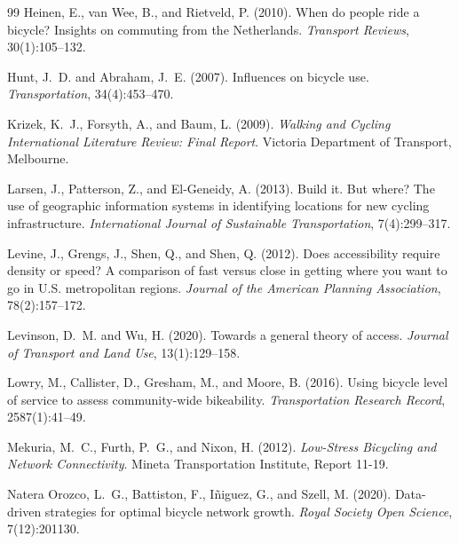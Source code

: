 \documentclass[12pt,a4paper]{article}
\begin{document}
\begin{thebibliography}{99}
Heinen, E., van Wee, B., and Rietveld, P. (2010).
\newblock When do people ride a bicycle? {I}nsights on commuting from the {N}etherlands.
\newblock \textit{Transport Reviews}, 30(1):105--132.

Hunt, J.~D. and Abraham, J.~E. (2007).
\newblock Influences on bicycle use.
\newblock \textit{Transportation}, 34(4):453--470.

Krizek, K.~J., Forsyth, A., and Baum, L. (2009).
\newblock \textit{Walking and Cycling International Literature Review: Final Report}.
\newblock Victoria Department of Transport, Melbourne.

Larsen, J., Patterson, Z., and El-Geneidy, A. (2013).
\newblock Build it. {B}ut where? {T}he use of geographic information systems in identifying locations for new cycling infrastructure.
\newblock \textit{International Journal of Sustainable Transportation}, 7(4):299--317.

Levine, J., Grengs, J., Shen, Q., and Shen, Q. (2012).
\newblock Does accessibility require density or speed? {A} comparison of fast versus close in getting where you want to go in {U.S.} metropolitan regions.
\newblock \textit{Journal of the American Planning Association}, 78(2):157--172.

Levinson, D.~M. and Wu, H. (2020).
\newblock Towards a general theory of access.
\newblock \textit{Journal of Transport and Land Use}, 13(1):129--158.

Lowry, M., Callister, D., Gresham, M., and Moore, B. (2016).
\newblock Using bicycle level of service to assess community-wide bikeability.
\newblock \textit{Transportation Research Record}, 2587(1):41--49.

Mekuria, M.~C., Furth, P.~G., and Nixon, H. (2012).
\newblock \textit{Low-Stress Bicycling and Network Connectivity}.
\newblock Mineta Transportation Institute, Report 11-19.

Natera Orozco, L.~G., Battiston, F., I\~{n}iguez, G., and Szell, M. (2020).
\newblock Data-driven strategies for optimal bicycle network growth.
\newblock \textit{Royal Society Open Science}, 7(12):201130.


\end{thebibliography}
\end{document}
